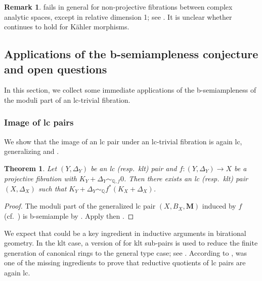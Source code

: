 \documentclass{amsart}
\newtheorem{thm}[theorem]{Theorem}
\theoremstyle{definition}
\newtheorem{remark}[theorem]{Remark}
\theoremstyle{remark}
\def\bQ{\mathbb{Q}}
\newcommand\bfM{{\bf M}}
\def\bfM{\mathbf{M}}
\numberwithin{equation}{section}
\begin{document}
\begin{remark}
   fails in general for non-projective
fibrations between complex analytic spaces, except in relative dimension 1; see \cite[Ex.~4.17 and Prop.~4.16]{LS2025}. It is unclear whether  continues to hold for K\"{a}hler morphisms. 
\end{remark}

\subsection{Applications of the  b-semiampleness conjecture and open questions}\label{sec:applicationbsemiampleness}

In this section, we collect some immediate applications of the  b-semiampleness of the moduli part of an lc-trivial fibration. 



\subsubsection{Image of lc pairs}
We show that the image of an lc pair under an lc-trivial fibration is again lc, generalizing \cite[Thm. 4.1]{Amb05} and \cite[Lem.~1.1]{FG14}. 
\begin{thm}\label{thm:lcimage}
Let $(Y, \Delta_Y)$ be an lc (resp.~klt) pair and $f \colon (Y,\Delta_Y)\to X$ be a projective fibration with $K_{Y} + \Delta_{Y} \sim_{\bQ, f} 0$.
Then there exists an lc (resp.~klt) pair $(X, \Delta_X)$ such that $K_{Y} + \Delta_Y \sim_{\bQ} f^*(K_{X} + \Delta_X)$.  
\end{thm}
\begin{proof}
The moduli part of the generalized lc pair $(X, B_{X}, \bfM)$ induced by $f$ (cf.~) is  b-semiample by . Apply then \cite[Lem.~4.3]{EFGMS2025}.
\end{proof}
We expect that  could be a key ingredient in inductive arguments in birational geometry.
In the klt case, a version of  for klt sub-pairs is used to reduce the finite generation of canonical rings to the general type case; see \cite[Cor.~1.1.2]{bchm}.
According to \cite[\S 1.8]{BGLM24},  was one of the missing ingredients to prove that reductive quotients of lc pairs are again lc.
\end{document}
